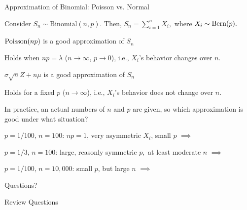   
  




\begin{frame}{Approximation of Binomial: Poisson vs. Normal}
  
  \plitemsep 0.1in
  \bci
  
\item Consider $S_n \sim \text{Binomial}(n,p).$ Then, $S_n =
  \sum_{i=1}^n X_i,$ where $X_i \sim \text{Bern}(p).$
\item<2->  $\text{Poisson}(np)$ is a good approximation of $S_n$
  \bci
  \item<4-> Holds when $np = \lambda$ ($n \rightarrow \infty$, $p
    \rightarrow 0$), i.e., $X_i$'s behavior changes over $n.$
  \eci
\item<3->  $\sigma\sqrt{n}Z + n\mu$ is a good approximation of $S_n$  
  \bci
  \item<5-> Holds for a fixed $p$ ($n \rightarrow \infty$), i.e., $X_i$'s
    behavior does not change over $n.$
  \eci
\item<6-> In practice, an actual numbers of $n$ and $p$ are given, so
  which approximation is good under what situation? 
  \bci
  \item<7-> $p=1/100$, $n=100$: $np=1$, very asymmetric $X_i$, small $p$
    $\implies$ 
  \item<8-> $p=1/3$, $n=100$: large, reasonly symmetric $p,$ at least moderate $n$ $\implies$ 

  \item<9-> $p=1/100$, $n=10,000$: small $p$, but large $n$ $\implies$  
    \eci
  \eci
\end{frame}




\begin{frame}{}
\vspace{2cm}
\LARGE Questions?

\end{frame}

\begin{frame}{Review Questions}

\bce[1)]
\item

\ece

\end{frame}






